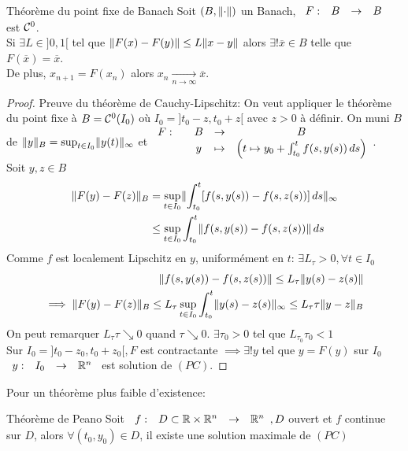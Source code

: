 \documentclass[]{report}
\begin{document}
    \begin{tm}{Théorème du point fixe de Banach}{}
        Soit $(B,\lVert \cdot  \rVert)$ un Banach, $\begin{array}{ccccc} F : & B & \to & B \end{array}$ est $\mathcal{C}^0$.\\
        Si $\exists L\in ]0,1[$ tel que $\lVert F(x)-F(y) \rVert\le L\lVert x-y \rVert$ alors $\exists! \overline{x}\in B$ telle que $F(\overline{x})=\overline{x}$.\\
        De plus, $x_{n+1}=F(x_n)$ alors $x_n\underset{n\to \infty}{\longrightarrow} \overline{x}$.\\
    \end{tm}

    \begin{proof}
        Preuve du théorème de Cauchy-Lipschitz: On veut appliquer le théorème du point fixe à $B=\mathcal{C}^0(I_0)$ où $I_0=]t_0-z,t_0+z[$ avec $z>0$ à définir. On muni $B$ de $\lVert y \rVert_B=\sup_{t\in I_0}\lVert y(t) \rVert_\infty$ et $\begin{array}{ccccc} F : & & B & \to & B \\ & & y & \mapsto & \left( t\mapsto y_0+\int_{t_0}^{t} f(s,y(s))\, ds\right) \end{array}$.\\
        Soit $y,z\in B$
        \begin{align*}
            \lVert F(y)-F(z) \rVert_B&=\sup_{t\in I_0}\lVert \int_{t_0}^{t}[f(s,y(s))-f(s,z(s))]\, ds \rVert_\infty\\
            &\le \sup_{t\in I_0}\int_{t_0}^{t} \lVert f(s,y(s))-f(s,z(s)) \rVert\, ds
        \end{align*}
        Comme $f$ est localement Lipschitz en $y$, uniformément en $t$: $\exists L_\tau>0,\forall t\in I_0$
        \begin{align*}
            \lVert f(s,y(s))-f(s,z(s)) \rVert\le L_\tau\lVert y(s)-z(s) \rVert\\
            \implies \lVert F(y)-F(z) \rVert_B\le L_\tau \sup_{t\in I_0} \int_{t_0}^{t}\lVert y(s)-z(s) \rVert_\infty \le L_\tau \tau\lVert y-z \rVert_B
        \end{align*}
        On peut remarquer $L_\tau \tau\searrow 0$ quand $\tau \searrow 0$. $\exists \tau_0>0$ tel que $L_{\tau_0} \tau_0<1$\\
        Sur $I_0=]t_0-z_0,t_0+z_0[,F$ est contractante $\implies \exists! y$ tel que $y=F(y)$ sur $I_0$ $\begin{array}{ccccc} y : & I_0 & \to & \mathbb{R}^n \end{array}$ est solution de $(PC)$.
    \end{proof}

    Pour un théorème plus faible d'existence:

    \begin{tm}{Théorème de Peano}{}
        Soit $\begin{array}{ccccc} f : & D\subset \mathbb{R}\times \mathbb{R}^n & \to & \mathbb{R}^n \end{array}, D$ ouvert et $f$ continue sur $D$, alors $\forall (t_0,y_0)\in D$, il existe une solution maximale de $(PC)$
    \end{tm}
\end{document}
